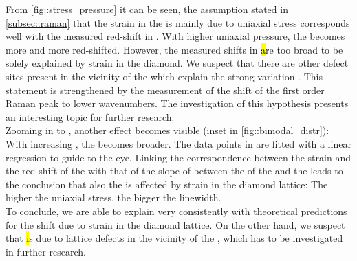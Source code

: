 	From \autoref{fig::stress_pressure} it can be seen, the assumption stated in \autoref{subsec::raman} that the strain in the \nds is mainly due to uniaxial stress corresponds well with the measured \ZPL red-shift in \vl.
	With higher uniaxial pressure, the \ZPL becomes more and more red-shifted.
	However, the measured shifts in \hl are too broad to be solely explained by strain in the diamond.
	We suspect that there are other defect sites present in the vicinity of the \siv which explain the strong variation \cite{Thiering2015}.
	This statement is strengthened by the measurement of the shift of the first order Raman peak to lower wavenumbers.
	The investigation of this hypothesis presents an interesting topic for further research.
	\\
	Zooming in to \vl, another effect becomes visible (inset in \autoref{fig::bimodal_distr}):
	With increasing  \ZPL, the \lw becomes broader.
	The data points in \vl are fitted with a linear regression to guide to the eye.
	Linking the correspondence between the strain and the red-shift of the \ZPL with that of the slope of between the \cwl of the \ZPL and the \lw leads to the conclusion that also the \lw is affected by strain in the diamond lattice: The higher the uniaxial stress, the bigger the linewidth.
	\\
	To conclude, we are able to explain \vl very consistently with theoretical predictions for the \ZPL \cwl shift due to strain in the diamond lattice. 
	On the other hand, we suspect that \hl is due to lattice defects in the vicinity of the \siv, which has to be investigated in further research.
